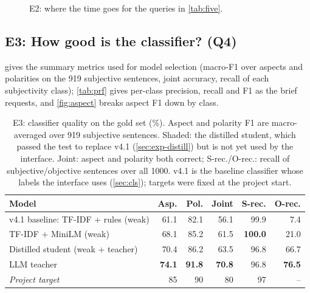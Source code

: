 \documentclass[10pt,twocolumn,a4paper]{article}
\newcommand{\best}[1]{\textbf{#1}}
\begin{document}
\begin{figure}[t]
\centering
{}
\caption{E2: where the time goes for the queries in \cref{tab:five}.}
\label{fig:latency}
\end{figure}

\subsection{E3: How good is the classifier? (Q4)}
\label{sec:exp-cls}

 gives the summary metrics used for model selection (macro-F1 over aspects and polarities on the 919
subjective sentences, joint accuracy, recall of each subjectivity class); \cref{tab:prf} gives per-class precision,
recall and F1 as the brief requests, and \cref{fig:aspect} breaks aspect F1 down by class.

\begin{table}[t]
\centering\small
\caption{E3: classifier quality on the gold set (\%). Aspect and polarity F1 are macro-averaged over 919 subjective
sentences. Shaded: the distilled student, which passed the test to replace v4.1 (\cref{sec:exp-distill}) but is not
yet used by the interface. Joint: aspect and polarity both correct; S-rec./O-rec.: recall of subjective/objective
sentences over all \num{1000}. v4.1 is the baseline classifier whose labels the interface uses (\cref{sec:cls}); targets
were fixed at the project start.}
\label{tab:cls}
\setlength{\tabcolsep}{3pt}
\begin{tabularx}{\columnwidth}{@{}Yrrrrr@{}}
\toprule
\textbf{Model} & \textbf{Asp.} & \textbf{Pol.} & \textbf{Joint} & \textbf{S-rec.} & \textbf{O-rec.} \\
\midrule
v4.1 baseline: TF-IDF + rules (weak) & 61.1 & 82.1 & 56.1 & 99.9 & 7.4 \\
TF-IDF + MiniLM (weak) & 68.1 & 85.2 & 61.5 & \best{100.0} & 21.0 \\
 Distilled student (weak + teacher) & 70.4 & 86.2 & 63.5 & 96.8 & 66.7 \\
LLM teacher & \best{74.1} & \best{91.8} & \best{70.8} & 96.8 & \best{76.5} \\
\midrule
\textit{Project target} & 85 & 90 & 80 & 97 & -- \\
\bottomrule
\end{tabularx}
\end{table}
\end{document}
